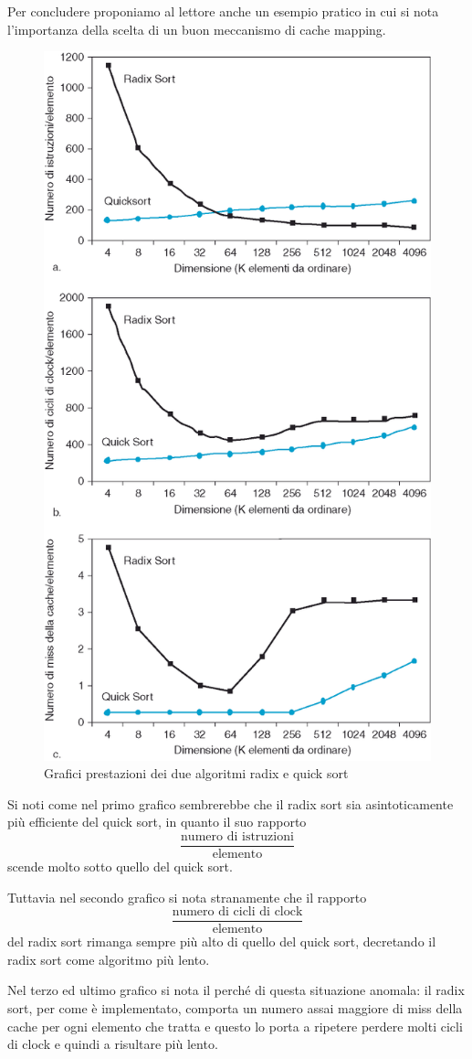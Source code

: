 \documentclass[class=book, crop=false, oneside]{standalone}
\begin{document}
Per concludere proponiamo al lettore anche un esempio pratico in cui si nota l'importanza della scelta di un buon meccanismo di cache mapping.
\begin{figure}
	\centering
	\includegraphics[width=0.7\linewidth,keepaspectratio]{grafici}
	\caption{Grafici prestazioni dei due algoritmi radix e quick sort}
\end{figure}
Si noti come nel primo grafico sembrerebbe che il radix sort sia asintoticamente più efficiente del quick sort, in quanto il suo rapporto
\begin{equation*}
	\frac{\textrm{numero di istruzioni}}{\textrm{elemento}}
\end{equation*}
scende molto sotto quello del quick sort.

Tuttavia nel secondo grafico si nota stranamente che il rapporto
\begin{equation*}
	\frac{\textrm{numero di cicli di clock}}{\textrm{elemento}}
\end{equation*}
del radix sort rimanga sempre più alto di quello del quick sort, decretando il radix sort come algoritmo più lento.

Nel terzo ed ultimo grafico si nota il perché di questa situazione anomala: il radix sort, per come è implementato, comporta un numero assai maggiore di miss della cache per ogni elemento che tratta e questo lo porta a ripetere perdere molti cicli di clock e quindi a risultare più lento.
\end{document}
